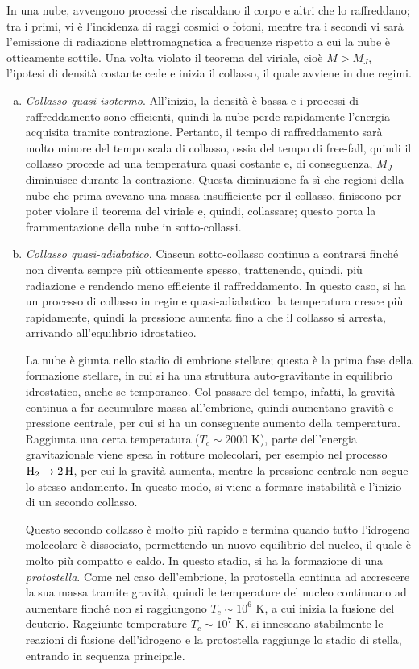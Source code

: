\documentclass[11pt, a4paper]{scrartcl}
\theoremstyle{style}
\theoremstyle{style1}
\numberwithin{equation}{subsection}
\begin{document}
In una nube, avvengono processi che riscaldano il corpo e altri che lo raffreddano; tra i primi, vi \`e l'incidenza di raggi cosmici o fotoni, mentre tra i secondi vi sar\`a l'emissione di radiazione elettromagnetica a frequenze rispetto a cui la nube \`e otticamente sottile.
Una volta violato il teorema del viriale, cio\`e $M>M_J$, l'ipotesi di densit\`a costante cede e inizia il collasso, il quale avviene in due regimi.
\begin{enumerate}[(a).]
	\item \textit{Collasso quasi-isotermo}. 
		All'inizio, la densit\`a \`e bassa e i processi di raffreddamento sono efficienti, quindi la nube perde rapidamente l'energia acquisita tramite contrazione. 
		Pertanto, il tempo di raffreddamento sar\`a molto minore del tempo scala di collasso, ossia del tempo di free-fall, quindi il collasso procede ad una temperatura quasi costante e, di conseguenza, $M_J$ diminuisce durante la contrazione.
		Questa diminuzione fa s\`i che regioni della nube che prima avevano una massa insufficiente per il collasso, finiscono per poter violare il teorema del viriale e, quindi, collassare; questo porta la frammentazione della nube in sotto-collassi. 

	\item \textit{Collasso quasi-adiabatico.} 
		Ciascun sotto-collasso continua a contrarsi finch\'e non diventa sempre pi\`u otticamente spesso, trattenendo, quindi, pi\`u radiazione e rendendo meno efficiente il raffreddamento. 
		In questo caso, si ha un processo di collasso in regime quasi-adiabatico: la temperatura cresce pi\`u rapidamente, quindi la pressione aumenta fino a che il collasso si arresta, arrivando all'equilibrio idrostatico.

		La nube \`e giunta nello stadio di embrione stellare; questa \`e la prima fase della formazione stellare, in cui si ha una struttura auto-gravitante in equilibrio idrostatico, anche se temporaneo.
Col passare del tempo, infatti, la gravit\`a continua a far accumulare massa all'embrione, quindi aumentano gravit\`a e pressione centrale, per cui si ha un conseguente aumento della temperatura.
Raggiunta una certa temperatura ($T_c \sim 2000$ K), parte dell'energia gravitazionale viene spesa in rotture molecolari, per esempio nel processo $\ce{H_2} \to \ce{2H}$, per cui la gravit\`a aumenta, mentre la pressione centrale non segue lo stesso andamento.
In questo modo, si viene a formare instabilit\`a e l'inizio di un secondo collasso.

Questo secondo collasso \`e molto pi\`u rapido e termina quando tutto l'idrogeno molecolare \`e dissociato, permettendo un nuovo equilibrio del nucleo, il quale \`e molto pi\`u compatto e caldo.
In questo stadio, si ha la formazione di una \textit{protostella}.
Come nel caso dell'embrione, la protostella continua ad accrescere la sua massa tramite gravit\`a, quindi le temperature del nucleo continuano ad aumentare finch\'e non si raggiungono $T_c \sim 10^6$ K, a cui inizia la fusione del deuterio.
Raggiunte temperature $T_c \sim 10^7$ K, si innescano stabilmente le reazioni di fusione dell'idrogeno e la protostella raggiunge lo stadio di stella, entrando in sequenza principale.
\end{enumerate}
\end{document}
